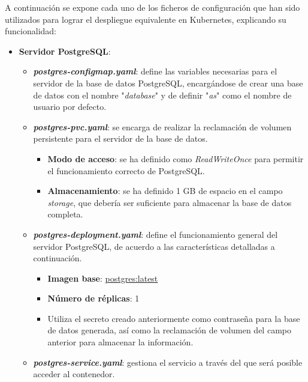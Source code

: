 \documentclass{report}
\begin{document}
            A continuación se expone cada uno de los ficheros de configuración que han sido utilizados para lograr el despliegue equivalente en Kubernetes, explicando su funcionalidad:

            \begin{itemize}
                \item \textbf{Servidor PostgreSQL}:
                \begin{itemize}
                    \item \textit{\textbf{postgres-configmap.yaml}}: define las variables necesarias para el servidor de la base de datos PostgreSQL, encargándose de crear una base de datos con el nombre "\textit{database}" y de definir "\textit{as}" como el nombre de usuario por defecto.
                    \item \textit{\textbf{postgres-pvc.yaml}}: se encarga de realizar la reclamación de volumen persistente para el servidor de la base de datos.
                    \begin{itemize}
                        \item \textbf{Modo de acceso}: se ha definido como \textit{ReadWriteOnce} para permitir el funcionamiento correcto de PostgreSQL.
                        \item \textbf{Almacenamiento}: se ha definido 1 GB de espacio en el campo \textit{storage}, que debería ser suficiente para almacenar la base de datos completa.
                    \end{itemize}
                    \item \textit{\textbf{postgres-deployment.yaml}}: define el funcionamiento general del servidor PostgreSQL, de acuerdo a las características detalladas a continuación.
                    \begin{itemize}
                        \item \textbf{Imagen base}: \href{https://hub.docker.com/_/postgres}{postgres:latest}
                        \item \textbf{Número de réplicas}: 1
                        \item Utiliza el secreto creado anteriormente como contraseña para la base de datos generada, así como la reclamación de volumen del campo anterior para almacenar la información.
                    \end{itemize}
                    \item \textit{\textbf{postgres-service.yaml}}: gestiona el servicio a través del que será posible acceder al contenedor.

\end{itemize}
\end{itemize}
\end{document}

